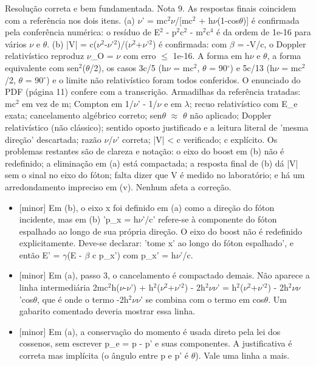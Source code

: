 \documentclass{article}%
\begin{document}
Resolução correta e bem fundamentada. Nota 9. As respostas finais coincidem com a referência nos dois itens. (a) $\nu$' = mc$^2$$\nu$/{[}mc$^2$ + h$\nu$(1-cos$\theta$){]} é confirmada pela conferência numérica: o resíduo de E$^2$ - p$^2$c$^2$ - m$^2$c$^{4}$ é da ordem de 1e{-}16 para vários $\nu$ e $\theta$. (b) |V| = c($\nu$$^2$-$\nu$'$^2$)/($\nu$$^2$+$\nu$'$^2$) é confirmada: com $\beta$ = -V/c, o Doppler relativístico reproduz $\nu$\_O = $\nu$ com erro $\leq$ 1e{-}16. A forma em h$\nu$ e $\theta$, a forma equivalente com sen$^2$($\theta$/2), os casos 3c/5 (h$\nu$ = mc$^2$, $\theta$ = 90$^\circ$) e 5c/13 (h$\nu$ = mc$^2$/2, $\theta$ = 90$^\circ$) e o limite não relativístico foram todos conferidos. O enunciado do PDF (página 11) confere com a transcrição. Armadilhas da referência tratadas: mc$^2$ em vez de m; Compton em 1/$\nu$' - 1/$\nu$ e em $\lambda$; recuo relativístico com E\_e exata; cancelamento algébrico correto; sen$\theta$ $\approx$ $\theta$ não aplicado; Doppler relativístico (não clássico); sentido oposto justificado e a leitura literal de 'mesma direção' descartada; razão $\nu$/$\nu$' correta; |V| < c verificado; c explícito. Os problemas restantes são de clareza e notação: o eixo do boost em (b) não é redefinido; a eliminação em (a) está compactada; a resposta final de (b) dá |V| sem o sinal no eixo do fóton; falta dizer que V é medido no laboratório; e há um arredondamento impreciso em (v). Nenhum afeta a correção.%
\begin{itemize}%
\item%
{[}minor{]} Em (b), o eixo x foi definido em (a) como a direção do fóton incidente, mas em (b) 'p\_x = h$\nu$'/c' refere{-}se à componente do fóton espalhado ao longo de sua própria direção. O eixo do boost não é redefinido explicitamente. Deve{-}se declarar: 'tome x' ao longo do fóton espalhado', e então E' = $\gamma$(E - $\beta$ c p\_x') com p\_x' = h$\nu$'/c.%
\item%
{[}minor{]} Em (a), passo 3, o cancelamento é compactado demais. Não aparece a linha intermediária 2mc$^2$h($\nu$-$\nu$') + h$^2$($\nu$$^2$+$\nu$'$^2$) - 2h$^2$$\nu$$\nu$' = h$^2$($\nu$$^2$+$\nu$'$^2$) - 2h$^2$$\nu$$\nu$'cos$\theta$, que é onde o termo -2h$^2$$\nu$$\nu$' se combina com o termo em cos$\theta$. Um gabarito comentado deveria mostrar essa linha.%
\item%
{[}minor{]} Em (a), a conservação do momento é usada direto pela lei dos cossenos, sem escrever p\_e = p - p' e suas componentes. A justificativa é correta mas implícita (o ângulo entre p e p' é $\theta$). Vale uma linha a mais.%

\end{itemize}$$
\end{document}
